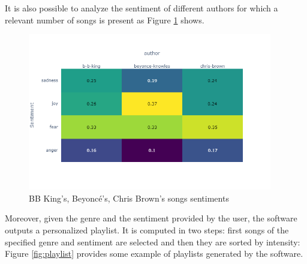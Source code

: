 \documentclass[runningheads]{llncs}
\begin{document}
It is also possible to analyze the sentiment of different authors for which a relevant number of songs is present as Figure \ref{fig:artists} shows.
\begin{figure}[H]
    \centering
    \includegraphics[width=0.95\textwidth]{images/artists.png}
    \caption{BB King's, Beyoncé's, Chris Brown's songs sentiments}
    \label{fig:artists}
\end{figure}
Moreover, given the genre and the sentiment provided by the user, the software outputs a personalized playlist. It is computed in two steps: first songs of the specified genre and sentiment are selected and then they are sorted by intensity: Figure \ref{fig:playlist} provides some example of playlists generated by the software.
\end{document}
